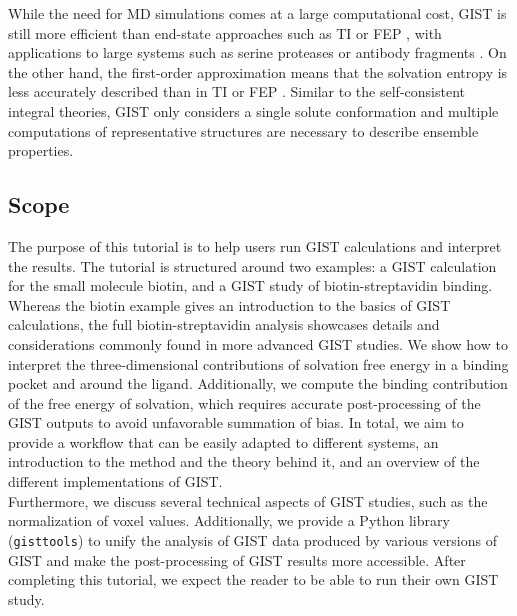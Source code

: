 \documentclass[9pt,tutorial]{livecoms}
\newcommand{\software}{\texttt}
\begin{document}
While the need for MD simulations comes at a large computational cost, GIST is still more efficient than end-state approaches such as TI \cite{Kirkwood1935-ti} or FEP \cite{Zwanzig1954-reweighting}, with applications to large systems such as serine proteases \cite{Kraml2019-gigist} or antibody fragments \cite{Waibl2021-gist-antibodies}.
On the other hand, the first-order approximation means that the solvation entropy is less accurately described than in TI or FEP \cite{Chen2021,Waibl2021-gist-salt}. 
Similar to the self-consistent integral theories, GIST only considers a single solute conformation and  multiple computations of representative structures are necessary to describe ensemble properties. 

\subsection{Scope}
The purpose of this tutorial is to help users run GIST calculations and interpret the results.
The tutorial is structured around two examples: a GIST calculation for the small molecule biotin, and a GIST study of biotin-streptavidin binding. 
Whereas the biotin example gives an introduction to the basics of GIST calculations, the full biotin-streptavidin analysis showcases details and considerations commonly found in more advanced GIST studies.
We show how to interpret the three-dimensional contributions of solvation free energy in a binding pocket and around the ligand.
Additionally, we compute the binding contribution of the free energy of solvation, which requires accurate post-processing of the GIST outputs to avoid unfavorable summation of bias.
In total, we aim to provide a workflow that can be easily adapted to different systems, an introduction to the method and the theory behind it, and an overview of the different implementations of GIST.\\
Furthermore, we discuss several technical aspects of GIST studies, such as the normalization of voxel values. 
Additionally, we provide a Python library (\software{gisttools}) to unify the analysis of GIST data produced by various versions of GIST and make the post-processing of GIST results more accessible.
After completing this tutorial, we expect the reader to be able to run their own GIST study. 

%
\end{document}
